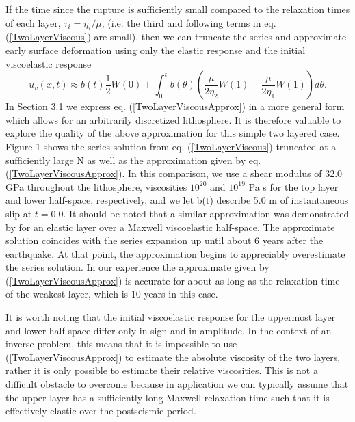 \documentclass[fleqn,12pt]{article}
\begin{document}
If the time since the rupture is sufficiently small compared to the
relaxation times of each layer, $\tau_i=\eta_i/\mu$, (i.e. the third
and following terms in eq. (\ref{TwoLayerViscous}) are small), then we
can truncate the series and approximate early surface deformation
using only the elastic response and the initial viscoelastic response
\begin{equation}\label{TwoLayerViscousApprox}
 u_v(x,t) \approx b(t)\frac{1}{2}W(0) + 
          \int_0^t b(\theta)\left(\frac{\mu}{2\eta_2}W(1) - 
                  \frac{\mu}{2\eta_1}W(1)\right)d\theta.
\end{equation} 
In Section 3.1 we express eq. (\ref{TwoLayerViscousApprox}) in a more
general form which allows for an arbitrarily discretized lithosphere.
It is therefore valuable to explore the quality of the above
approximation for this simple two layered case. Figure 1 shows the
series solution from eq. (\ref{TwoLayerViscous}) truncated at a
sufficiently large N as well as the approximation given by
eq. (\ref{TwoLayerViscousApprox}). In this comparison, we use a shear
modulus of 32.0 GPa throughout the lithosphere, viscosities $10^{20}$
and $10^{19}$ Pa s for the top layer and lower half-space,
respectively, and we let b(t) describe 5.0 m of instantaneous slip
at $t=0.0$.  It should be noted that a similar approximation was
demonstrated by \citet{S2010} for an elastic layer over a Maxwell
viscoelastic half-space.  The approximate solution coincides with the
series expansion up until about 6 years after the earthquake.  At that
point, the approximation begins to appreciably overestimate the series
solution.  In our experience the approximate given by
(\ref{TwoLayerViscousApprox}) is accurate for about as long as the
relaxation time of the weakest layer, which is 10 years in this case.

It is worth noting that the initial viscoelastic response for the
uppermost layer and lower half-space differ only in sign and in
amplitude.  In the context of an inverse problem, this means that it
is impossible to use (\ref{TwoLayerViscousApprox}) to estimate the
absolute viscosity of the two layers, rather it is only possible to
estimate their relative viscosities.  This is not a difficult obstacle
to overcome because in application we can typically assume that the
upper layer has a sufficiently long Maxwell relaxation time such that
it is effectively elastic over the postseismic period.
\end{document}
